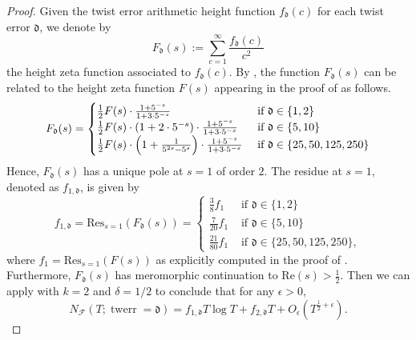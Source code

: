 \documentclass[12pt]{amsart}
\numberwithin{equation}{section} %
\theoremstyle{definition} \newtheorem{definition}[counter]{Definition}
\theoremstyle{remark} \newtheorem{nonexam}[counter]{Non-example}
\newcommand{\FF}{\mathscr{F}} %
\let\originalleft\left \let\originalright\right
\renewcommand{\left}{\mathopen{}\mathclose\bgroup\originalleft}
\renewcommand{\right}{\aftergroup\egroup\originalright}
\DeclareMathOperator{\twerr}{twerr} %
\begin{document}
\begin{proof}
    Given the twist error arithmetic height function $f_{\mathfrak{d}}(c)$ for each twist error $\mathfrak{d}$, we denote by
    \begin{equation*}
        F_\mathfrak{d}(s) := \sum_{c=1}^\infty \frac{f_{\mathfrak{d}}(c)}{c^2}
    \end{equation*}
    the height zeta function associated to $f_{\mathfrak{d}}(c)$. By , the function $F_\mathfrak{d}(s)$ can be related to the height zeta function $F(s)$ appearing in the proof of  as follows.
    \begin{equation}
        F_\mathfrak{d}(s) = \begin{cases}
            \frac{1}{2} F(s) \cdot \frac{1 + 5^{-s}}{1 + 3 \cdot 5^{-s}} &\text{ if } \mathfrak{d} \in \{1, 2\} \\
            \frac{1}{2} F(s) \cdot (1 + 2 \cdot 5^{-s}) \cdot \frac{1 + 5^{-s}}{1 + 3 \cdot 5^{-s}} &\text{ if } \mathfrak{d} \in \{5,10\} \\
            \frac{1}{2} F(s) \cdot \left( 1 + \frac{1}{5^{2s} - 5^s} \right) \cdot \frac{1 + 5^{-s}}{1 + 3 \cdot 5^{-s}} &\text{ if } \mathfrak{d} \in \{25,50,125,250\}
        \end{cases}
    \end{equation}
    Hence, $F_{\mathfrak{d}}(s)$ has a unique pole at $s = 1$ of order $2$. The residue at $s = 1$, denoted as $f_{1,\mathfrak{d}}$, is given by
    \begin{equation} \label{eqn:f-1-mathfrakd-formula}
        f_{1,\mathfrak{d}} = \text{Res}_{s=1}(F_\mathfrak{d}(s)) = \begin{cases}
            \frac{3}{8} f_1 &\text{ if } \mathfrak{d} \in \{1,2\} \\
            \frac{7}{20} f_1 &\text{ if } \mathfrak{d} \in \{5,10\} \\
            \frac{21}{80} f_1 &\text{ if } \mathfrak{d} \in \{25,50,125,250\},
        \end{cases}
    \end{equation}
    where $f_1 = \text{Res}_{s=1}(F(s))$ as explicitly computed in the proof of . Furthermore, $F_\mathfrak{d}(s)$ has meromorphic continuation to $\text{Re}(s) > \frac{1}{2}$. Then we can apply  with $k = 2$
    and $\delta = 1/2$ to conclude that for any $\epsilon > 0$,
    \begin{equation*}
        N_\FF(T; \twerr = \mathfrak{d}) = f_{1,\mathfrak{d}} T \log T + f_{2,\mathfrak{d}} T + O_\epsilon(T^{\frac{1}{2} + \epsilon}).
    \end{equation*}


\end{proof}
\end{document}
